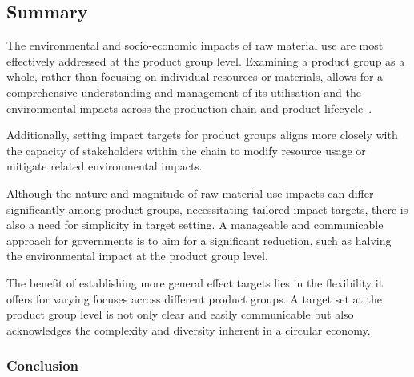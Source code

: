 \subsectionEndline
\clearpage

\subsection{Summary}


The environmental and socio-economic impacts of raw material use are most effectively addressed at the product group level. Examining a product group as a whole, rather than focusing on individual resources or materials, allows for a comprehensive understanding and management of its utilisation and the environmental impacts across the production chain and product lifecycle~\cite{pbl2021ce}. 

Additionally, setting impact targets for product groups aligns more closely with the capacity of stakeholders within the chain to modify resource usage or mitigate related environmental impacts.

Although the nature and magnitude of raw material use impacts can differ significantly among product groups, necessitating tailored impact targets, there is also a need for simplicity in target setting. A manageable and communicable approach for governments is to aim for a significant reduction, such as halving the environmental impact at the product group level. 

The benefit of establishing more general effect targets lies in the flexibility it offers for varying focuses across different product groups. A target set at the product group level is not only clear and easily communicable but also acknowledges the complexity and diversity inherent in a circular economy.


\clearpage


\clearpage

\clearpage


\clearpage

\clearpage


\clearpage

\clearpage


\clearpage

\clearpage


\clearpage

\clearpage


\subsubsection{Conclusion}




\sectionEndlines
\clearpage